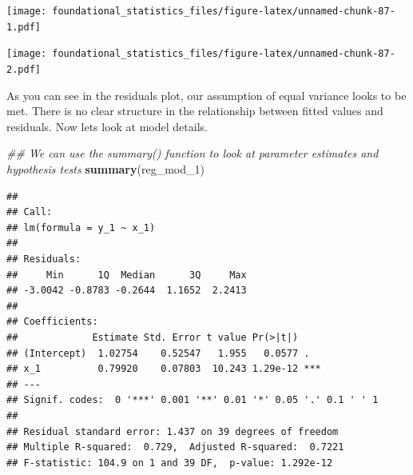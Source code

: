 \documentclass[]{book}
\newenvironment{Shaded}{\begin{snugshade}}{\end{snugshade}}
\newcommand{\CommentTok}[1]{\textcolor[rgb]{0.56,0.35,0.01}{\textit{#1}}}
\newcommand{\DataTypeTok}[1]{\textcolor[rgb]{0.13,0.29,0.53}{#1}}
\newcommand{\DecValTok}[1]{\textcolor[rgb]{0.00,0.00,0.81}{#1}}
\newcommand{\KeywordTok}[1]{\textcolor[rgb]{0.13,0.29,0.53}{\textbf{#1}}}
\newcommand{\NormalTok}[1]{#1}
\newcommand{\OperatorTok}[1]{\textcolor[rgb]{0.81,0.36,0.00}{\textbf{#1}}}
\newcommand{\StringTok}[1]{\textcolor[rgb]{0.31,0.60,0.02}{#1}}
\begin{document}
\texttt{[image: foundational\_statistics\_files/figure-latex/unnamed-chunk-87-1.pdf]}

\begin{Shaded}
\end{Shaded}

\texttt{[image: foundational\_statistics\_files/figure-latex/unnamed-chunk-87-2.pdf]}

As you can see in the residuals plot, our assumption of equal variance looks to be met. There is no clear structure in the relationship between fitted values and residuals. Now lets look at model details.

\begin{Shaded}
\begin{Highlighting}[]
\CommentTok{## We can use the summary() function to look at parameter estimates and hypothesis tests}
\KeywordTok{summary}\NormalTok{(reg_mod_}\DecValTok{1}\NormalTok{)}
\end{Highlighting}
\end{Shaded}

\begin{verbatim}
## 
## Call:
## lm(formula = y_1 ~ x_1)
## 
## Residuals:
##     Min      1Q  Median      3Q     Max 
## -3.0042 -0.8783 -0.2644  1.1652  2.2413 
## 
## Coefficients:
##             Estimate Std. Error t value Pr(>|t|)    
## (Intercept)  1.02754    0.52547   1.955   0.0577 .  
## x_1          0.79920    0.07803  10.243 1.29e-12 ***
## ---
## Signif. codes:  0 '***' 0.001 '**' 0.01 '*' 0.05 '.' 0.1 ' ' 1
## 
## Residual standard error: 1.437 on 39 degrees of freedom
## Multiple R-squared:  0.729,  Adjusted R-squared:  0.7221 
## F-statistic: 104.9 on 1 and 39 DF,  p-value: 1.292e-12
\end{verbatim}
\end{document}
